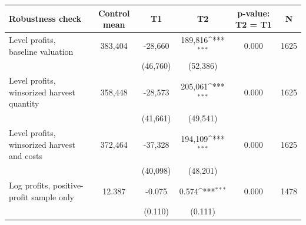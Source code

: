{
\def\sym#1{\ifmmode^{#1}\else\(^{#1}\)\fi}
\begin{tabular}{lccccc}
\hline\hline
Robustness check & Control mean & T1 & T2 & p-value: T2 = T1 & N \\
\hline
Level profits, baseline valuation & 383,404 & -28,660 & 189,816\sym{***} & 0.000 & 1625 \\
& & (46,760) & (52,386) & & \\
Level profits, winsorized harvest quantity & 358,448 & -28,573 & 205,061\sym{***} & 0.000 & 1625 \\
& & (41,661) & (49,541) & & \\
Level profits, winsorized harvest and costs & 372,464 & -37,328 & 194,109\sym{***} & 0.000 & 1625 \\
& & (40,098) & (48,201) & & \\
Log profits, positive-profit sample only & 12.387 & -0.075 & 0.574\sym{***} & 0.000 & 1478 \\
& & (0.110) & (0.111) & & \\
\hline\hline
\end{tabular}
}
